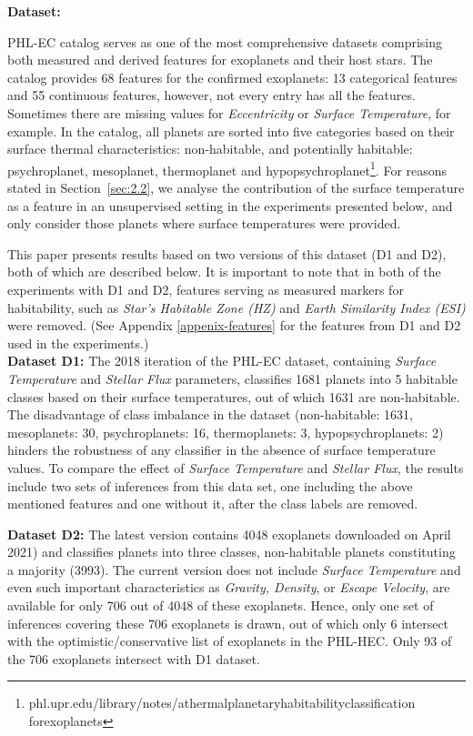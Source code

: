 \documentclass[fleqn,usenatbib]{mnras}
\begin{document}
\noindent \textbf{Dataset:}

PHL-EC catalog serves as one of the most comprehensive datasets comprising both measured and derived features for exoplanets and their host stars. The catalog provides 68 features for the confirmed exoplanets: 13 categorical features and 55 continuous features, however, not every entry has all the features. Sometimes there are missing values for \textsl{Eccentricity} or \textsl{Surface Temperature}, for example. In the catalog, all planets are sorted into five categories based on their surface thermal  characteristics: non-habitable, and potentially habitable: psychroplanet, mesoplanet, thermoplanet and hypopsychroplanet\footnote{\!\!phl.upr.edu/library/notes/athermalplanetaryhabitabilityclassification\\forexoplanets}. For reasons stated in Section~\ref{sec:2.2}, we analyse the contribution of the surface temperature as a feature in an unsupervised setting in the experiments presented below, and only consider those planets where surface temperatures were provided.

This paper presents results based on two versions of this dataset (D1 and D2), both of which are described below. It is important to note that in both of the experiments with D1 and D2, features serving as measured markers for habitability, such as \textsl{Star's Habitable Zone (HZ)} and \textsl{Earth Similarity Index (ESI)} were removed. (See Appendix \ref{appenix-features} for the features from D1 and D2 used in the experiments.)  \\
\noindent \textbf{Dataset D1:}
The 2018 iteration of the PHL-EC dataset, containing \textsl{Surface Temperature} and \textsl{Stellar Flux} parameters, classifies 1681 planets into 5 habitable classes based on their surface temperatures, out of which 1631 are non-habitable. The disadvantage of class imbalance in the dataset (non-habitable: 1631, mesoplanets: 30, psychroplanets: 16, thermoplanets: 3, hypopsychroplanets: 2) hinders the robustness of any classifier in the absence of surface temperature values. To compare the effect of \textsl{Surface Temperature} and \textsl{Stellar Flux}, the results include two sets of inferences from this data set, one including the above mentioned features and one without it, after the class labels are removed. 

\noindent \textbf{Dataset D2:} The latest version contains 4048 exoplanets downloaded on April 2021) and classifies planets into three classes, non-habitable planets constituting a majority (3993). The current version does not include \textsl{Surface Temperature} and even such important characteristics as \textsl{Gravity, Density}, or \textsl{Escape Velocity}, are available for only 706 out of 4048 of these exoplanets. Hence, only one set of inferences covering these 706 exoplanets is drawn, out of which only 6 intersect with the optimistic/conservative list of exoplanets in the PHL-HEC. Only 93 of the 706 exoplanets intersect with D1 dataset.
\end{document}
